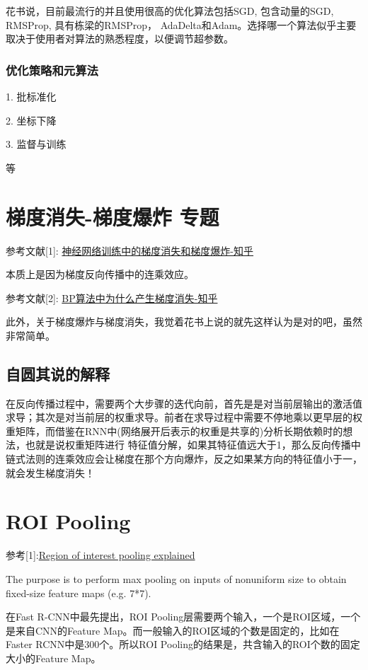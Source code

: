 花书说，目前最流行的并且使用很高的优化算法包括SGD, 包含动量的SGD, RMSProp, 具有栋梁的RMSProp， AdaDelta和Adam。选择哪一个算法似乎主要取决于使用者对算法的熟悉程度，以便调节超参数。

\subsubsection{优化策略和元算法}

1. 批标准化

2. 坐标下降

3. 监督与训练

等


\section{梯度消失-梯度爆炸 专题}

参考文献[1]: \href{https://zhuanlan.zhihu.com/p/25631496}{神经网络训练中的梯度消失和梯度爆炸-知乎}

本质上是因为梯度反向传播中的连乘效应。

参考文献[2]: \href{https://www.zhihu.com/question/49812013}{BP算法中为什么产生梯度消失-知乎}

此外，关于梯度爆炸与梯度消失，我觉着花书上说的就先这样认为是对的吧，虽然非常简单。

\subsection{自圆其说的解释}

在反向传播过程中，需要两个大步骤的迭代向前，首先是是对当前层输出的激活值求导；其次是对当前层的权重求导。前者在求导过程中需要不停地乘以更早层的权重矩阵，而借鉴在RNN中(网络展开后表示的权重是共享的)分析长期依赖时的想法，也就是说权重矩阵进行
特征值分解，如果其特征值远大于1，那么反向传播中链式法则的连乘效应会让梯度在那个方向爆炸，反之如果某方向的特征值小于一，就会发生梯度消失！


\section{ROI Pooling}

参考[1]:\href{https://deepsense.ai/region-of-interest-pooling-explained/}{Region of interest pooling explained}

The purpose is to perform max pooling on inputs of nonuniform size to obtain fixed-size feature maps (e.g. 7*7).

在Fast R-CNN中最先提出，ROI Pooling层需要两个输入，一个是ROI区域，一个是来自CNN的Feature Map。而一般输入的ROI区域的个数是固定的，比如在Faster RCNN中是300个。所以ROI Pooling的结果是，共含输入的ROI个数的固定大小的Feature Map。

